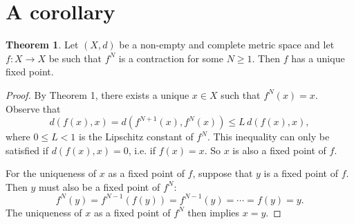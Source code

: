 \documentclass[12pt]{article}
\newcommand{\newp}{\vspace{5mm}}
\theoremstyle{definition}
\newtheorem{theorem}{Theorem}
\begin{document}
\section{A corollary}

\begin{theorem}

Let \( (X, d) \) be a non-empty and complete metric space and let \( f : X \to X \) be such that \( f^N \) is a contraction for some \( N \geq 1 \). Then \( f \) has a unique fixed point.

\end{theorem}

\begin{proof}
By Theorem 1, there exists a unique \( x \in X \) such that \( f^N(x) = x \). Observe that
\[
    d(f(x), x) = d(f^{N+1}(x), f^N(x)) \leq L \, d(f(x), x),
\]
where \( 0 \leq L < 1 \) is the Lipschitz constant of \( f^N \). This inequality can only be satisfied if \( d(f(x), x) = 0 \), i.e. if \( f(x) = x \). So \( x \) is also a fixed point of \( f \).

\newp

For the uniqueness of \( x \) as a fixed point of \( f \), suppose that \( y \) is a fixed point of \( f \). Then \( y \) must also be a fixed point of \( f^N \):
\[
    f^N(y) = f^{N-1}(f(y)) = f^{N-1}(y) = \cdots = f(y) = y.
\]
The uniqueness of \( x \) as a fixed point of \( f^N \) then implies \( x = y \).
\end{proof}
\end{document}
